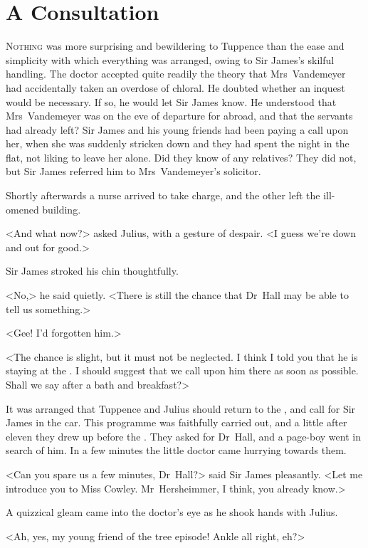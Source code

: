 \chapter{A Consultation} 

 \lettrine{N}{othing} was more surprising and bewildering to Tuppence than the ease and simplicity with which everything was arranged, owing to Sir James's skilful handling. The doctor accepted quite readily the theory that Mrs~Vandemeyer had accidentally taken an overdose of chloral. He doubted whether an inquest would be necessary. If so, he would let Sir James know. He understood that Mrs~Vandemeyer was on the eve of departure for abroad, and that the servants had already left? Sir James and his young friends had been paying a call upon her, when she was suddenly stricken down and they had spent the night in the flat, not liking to leave her alone. Did they know of any relatives? They did not, but Sir James referred him to Mrs~Vandemeyer's solicitor.

Shortly afterwards a nurse arrived to take charge, and the other left the ill-omened building.

<And what now?> asked Julius, with a gesture of despair. <I guess we're down and out for good.>

Sir James stroked his chin thoughtfully.

<No,> he said quietly. <There is still the chance that Dr~Hall may be able to tell us something.>

<Gee! I'd forgotten him.>

<The chance is slight, but it must not be neglected. I think I told you that he is staying at the . I should suggest that we call upon him there as soon as possible. Shall we say after a bath and breakfast?>

It was arranged that Tuppence and Julius should return to the , and call for Sir James in the car. This programme was faithfully carried out, and a little after eleven they drew up before the . They asked for Dr~Hall, and a page-boy went in search of him. In a few minutes the little doctor came hurrying towards them.

<Can you spare us a few minutes, Dr~Hall?> said Sir James pleasantly. <Let me introduce you to Miss Cowley. Mr~Hersheimmer, I think, you already know.>

A quizzical gleam came into the doctor's eye as he shook hands with Julius.

<Ah, yes, my young friend of the tree episode! Ankle all right, eh?>

